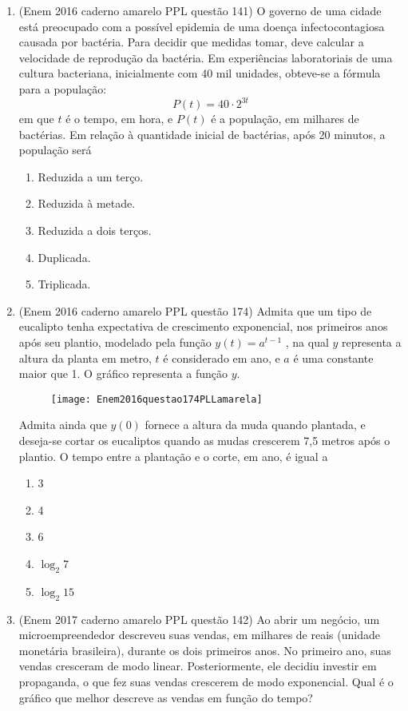 \begin{enumerate}
	\item (Enem 2016 caderno amarelo PPL questão 141) O governo de uma cidade está preocupado com a possível epidemia de uma doença infectocontagiosa causada por bactéria. Para decidir que medidas tomar, deve calcular a velocidade de reprodução da bactéria. Em experiências laboratoriais de uma cultura bacteriana, inicialmente com 40 mil unidades, obteve-se a fórmula para a população:
	$$ P(t)=40\cdot 2^{3t} $$
	em que $ t $ é o tempo, em hora, e $ P(t) $ é a população, em milhares de bactérias. Em relação à quantidade inicial de bactérias, após 20 minutos, a população será
	\begin{enumerate}
		\item Reduzida a um terço.
		\item Reduzida à metade.
		\item Reduzida a dois terços.
		\item Duplicada.
		\item Triplicada.
	\end{enumerate}
	
	\clearpage

	\item (Enem 2016 caderno amarelo PPL questão 174) Admita que um tipo de eucalipto tenha expectativa de crescimento exponencial, nos primeiros anos após seu plantio, modelado pela função $ y(t)=a^{t-1} $ , na qual $ y $ representa a altura da planta em metro, $ t $ é considerado em ano, e $ a $ é uma constante maior que 1. O gráfico representa a função $ y $.
	\begin{figure}[H]
		\centering
		\texttt{[image: Enem2016questao174PLLamarela]}
		\caption{}
		\label{fig:enem2016questao174pllamarela}
	\end{figure}
	
	Admita ainda que $ y(0) $ fornece a altura da muda quando plantada, e deseja-se cortar os eucaliptos quando as mudas crescerem 7,5 metros após o plantio. O tempo entre a plantação e o corte, em ano, é igual a
	\begin{enumerate}
		\item 3
		\item 4
		\item 6
		\item $ \log_2 7 $
		\item $ \log_2 15 $
	\end{enumerate}
	
	\item (Enem 2017 caderno amarelo PPL questão 142) Ao abrir um negócio, um microempreendedor descreveu suas vendas, em milhares de reais (unidade monetária brasileira), durante os dois primeiros anos. No primeiro ano, suas vendas cresceram de modo linear. Posteriormente, ele decidiu investir em propaganda, o que fez suas vendas crescerem de modo exponencial.
	Qual é o gráfico que melhor descreve as vendas em função do tempo?


\end{enumerate}
